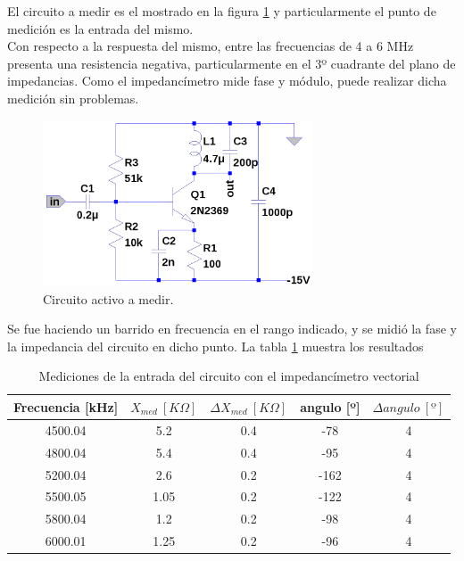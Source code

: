 \documentclass[a4paper,10pt]{article}
\begin{document}
		\indent El circuito a medir es el mostrado en la figura \ref{img006} y 
		particularmente el punto de medición es la entrada del mismo. \\
		\indent Con respecto a la respuesta del mismo, entre las frecuencias 
		de 4 a 6 MHz presenta una resistencia negativa, particularmente en el 3º
		cuadrante del plano de impedancias. Como el impedancímetro mide fase y
		módulo, puede realizar dicha medición sin problemas.
		
		\begin{figure}[!htb]
			\centering
			\includegraphics[width=8cm]{Imagenes/ActiveCircuit.png}
			\caption{Circuito activo a medir.}
			\label{img006} 
		\end{figure}

		\indent Se fue haciendo un barrido en frecuencia en el rango indicado,
		y se midió la fase y la impedancia del circuito en dicho punto. La 
		tabla \ref{tabbla} muestra los resultados

		\begin{table}[!htp]
			\centering
			\begin{tabular}{|c|c|c|c|c|}
				\hline
				Frecuencia [kHz] & $X_{med}~[K\Omega]$ & 
				$\Delta X_{med}~[K\Omega]$ & angulo [º] & $\Delta angulo~[º]$ \\
				\hline
				4500.04 & 5.2 & 0.4 & -78 & 4 \\
				\hline
				4800.04 & 5.4 & 0.4 & -95 & 4 \\ 
				\hline
				5200.04 & 2.6 & 0.2 & -162 & 4 \\
				\hline
				5500.05 & 1.05 & 0.2 & -122 & 4 \\ 
				\hline									
				5800.04 & 1.2 & 0.2 & -98 & 4 \\
				\hline
				6000.01 & 1.25 & 0.2 & -96 & 4 \\
				\hline
			\end{tabular}
			\caption{Mediciones de la entrada del circuito con el 
			impedancímetro vectorial} \label{tabbla}
		\end{table}
		
\end{document}
